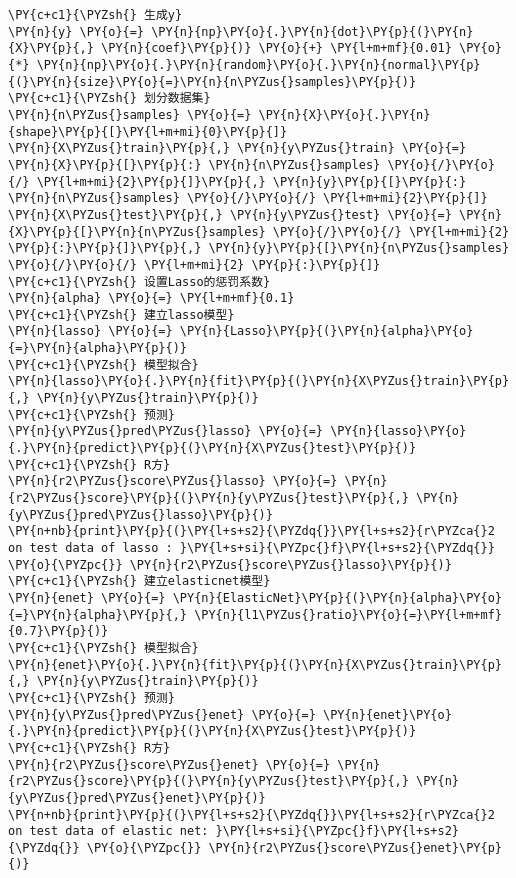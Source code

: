 \begin{Verbatim}[commandchars=\\\{\}]
\PY{c+c1}{\PYZsh{} 生成y}
\PY{n}{y} \PY{o}{=} \PY{n}{np}\PY{o}{.}\PY{n}{dot}\PY{p}{(}\PY{n}{X}\PY{p}{,} \PY{n}{coef}\PY{p}{)} \PY{o}{+} \PY{l+m+mf}{0.01} \PY{o}{*} \PY{n}{np}\PY{o}{.}\PY{n}{random}\PY{o}{.}\PY{n}{normal}\PY{p}{(}\PY{n}{size}\PY{o}{=}\PY{n}{n\PYZus{}samples}\PY{p}{)}
\PY{c+c1}{\PYZsh{} 划分数据集}
\PY{n}{n\PYZus{}samples} \PY{o}{=} \PY{n}{X}\PY{o}{.}\PY{n}{shape}\PY{p}{[}\PY{l+m+mi}{0}\PY{p}{]}
\PY{n}{X\PYZus{}train}\PY{p}{,} \PY{n}{y\PYZus{}train} \PY{o}{=} \PY{n}{X}\PY{p}{[}\PY{p}{:} \PY{n}{n\PYZus{}samples} \PY{o}{/}\PY{o}{/} \PY{l+m+mi}{2}\PY{p}{]}\PY{p}{,} \PY{n}{y}\PY{p}{[}\PY{p}{:} \PY{n}{n\PYZus{}samples} \PY{o}{/}\PY{o}{/} \PY{l+m+mi}{2}\PY{p}{]}
\PY{n}{X\PYZus{}test}\PY{p}{,} \PY{n}{y\PYZus{}test} \PY{o}{=} \PY{n}{X}\PY{p}{[}\PY{n}{n\PYZus{}samples} \PY{o}{/}\PY{o}{/} \PY{l+m+mi}{2} \PY{p}{:}\PY{p}{]}\PY{p}{,} \PY{n}{y}\PY{p}{[}\PY{n}{n\PYZus{}samples} \PY{o}{/}\PY{o}{/} \PY{l+m+mi}{2} \PY{p}{:}\PY{p}{]}
\PY{c+c1}{\PYZsh{} 设置Lasso的惩罚系数}
\PY{n}{alpha} \PY{o}{=} \PY{l+m+mf}{0.1}
\PY{c+c1}{\PYZsh{} 建立lasso模型}
\PY{n}{lasso} \PY{o}{=} \PY{n}{Lasso}\PY{p}{(}\PY{n}{alpha}\PY{o}{=}\PY{n}{alpha}\PY{p}{)}
\PY{c+c1}{\PYZsh{} 模型拟合}
\PY{n}{lasso}\PY{o}{.}\PY{n}{fit}\PY{p}{(}\PY{n}{X\PYZus{}train}\PY{p}{,} \PY{n}{y\PYZus{}train}\PY{p}{)}
\PY{c+c1}{\PYZsh{} 预测}
\PY{n}{y\PYZus{}pred\PYZus{}lasso} \PY{o}{=} \PY{n}{lasso}\PY{o}{.}\PY{n}{predict}\PY{p}{(}\PY{n}{X\PYZus{}test}\PY{p}{)}
\PY{c+c1}{\PYZsh{} R方}
\PY{n}{r2\PYZus{}score\PYZus{}lasso} \PY{o}{=} \PY{n}{r2\PYZus{}score}\PY{p}{(}\PY{n}{y\PYZus{}test}\PY{p}{,} \PY{n}{y\PYZus{}pred\PYZus{}lasso}\PY{p}{)}
\PY{n+nb}{print}\PY{p}{(}\PY{l+s+s2}{\PYZdq{}}\PY{l+s+s2}{r\PYZca{}2 on test data of lasso : }\PY{l+s+si}{\PYZpc{}f}\PY{l+s+s2}{\PYZdq{}} \PY{o}{\PYZpc{}} \PY{n}{r2\PYZus{}score\PYZus{}lasso}\PY{p}{)}
\PY{c+c1}{\PYZsh{} 建立elasticnet模型}
\PY{n}{enet} \PY{o}{=} \PY{n}{ElasticNet}\PY{p}{(}\PY{n}{alpha}\PY{o}{=}\PY{n}{alpha}\PY{p}{,} \PY{n}{l1\PYZus{}ratio}\PY{o}{=}\PY{l+m+mf}{0.7}\PY{p}{)}
\PY{c+c1}{\PYZsh{} 模型拟合}
\PY{n}{enet}\PY{o}{.}\PY{n}{fit}\PY{p}{(}\PY{n}{X\PYZus{}train}\PY{p}{,} \PY{n}{y\PYZus{}train}\PY{p}{)}
\PY{c+c1}{\PYZsh{} 预测}
\PY{n}{y\PYZus{}pred\PYZus{}enet} \PY{o}{=} \PY{n}{enet}\PY{o}{.}\PY{n}{predict}\PY{p}{(}\PY{n}{X\PYZus{}test}\PY{p}{)}
\PY{c+c1}{\PYZsh{} R方}
\PY{n}{r2\PYZus{}score\PYZus{}enet} \PY{o}{=} \PY{n}{r2\PYZus{}score}\PY{p}{(}\PY{n}{y\PYZus{}test}\PY{p}{,} \PY{n}{y\PYZus{}pred\PYZus{}enet}\PY{p}{)}
\PY{n+nb}{print}\PY{p}{(}\PY{l+s+s2}{\PYZdq{}}\PY{l+s+s2}{r\PYZca{}2 on test data of elastic net: }\PY{l+s+si}{\PYZpc{}f}\PY{l+s+s2}{\PYZdq{}} \PY{o}{\PYZpc{}} \PY{n}{r2\PYZus{}score\PYZus{}enet}\PY{p}{)}

\end{Verbatim}
